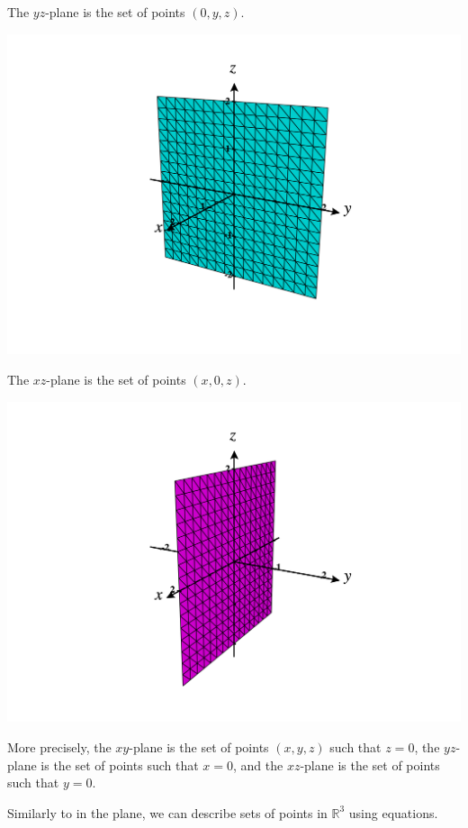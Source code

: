 \documentclass{ximera}
\begin{document}
The $yz$-plane is the set of points $(0,y,z)$.
\begin{image}
\includegraphics[width=\textwidth]{CalcPlot3D-yz_plane}
\end{image}

The $xz$-plane is the set of points $(x,0,z)$.
\begin{image}
\includegraphics[width=\textwidth]{CalcPlot3D-xz_plane}
\end{image}

More precisely, the $xy$-plane is the set of points $(x,y,z)$ such that $z = 0$, the $yz$-plane is the set of points such that $x = 0$, and the $xz$-plane is the set of points such that $y = 0$.

Similarly to in the plane, we can describe sets of points in $\mathbb{R}^3$ using equations.
\end{document}

